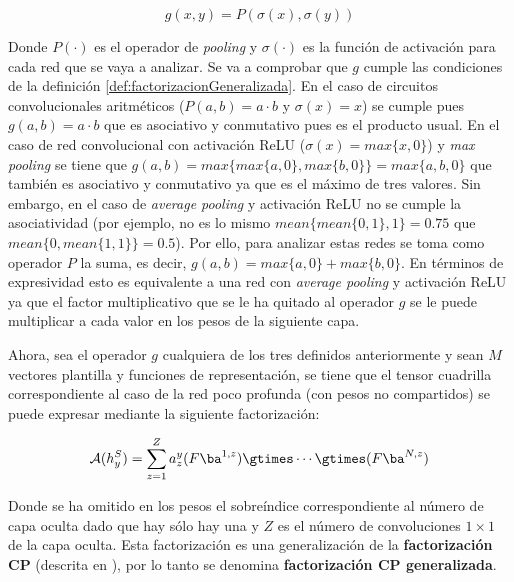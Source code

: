 \begin{equation}
	g(x,y)=P(\sigma(x),\sigma(y))
\end{equation}

Donde $P(\cdot)$ es el operador de \textit{pooling} y $\sigma(\cdot)$ es la función de activación para cada red que se vaya a analizar. Se va a comprobar que $g$ cumple las condiciones de la definición \ref{def:factorizacionGeneralizada}. En el caso de circuitos convolucionales aritméticos ($P(a,b)=a\cdot b$ y $\sigma(x)=x$) se cumple pues $g(a,b)=a\cdot b$ que es asociativo y conmutativo pues es el producto usual. En el caso de red convolucional con activación ReLU ($\sigma(x) = max\{x,0\}$) y \textit{max pooling} se tiene que $g(a,b)=max\{max\{a,0\},max\{b,0\}\}=max\{a,b,0\}$ que también es asociativo y conmutativo ya que es el máximo de tres valores. Sin embargo, en el caso de \textit{average pooling} y activación ReLU no se cumple la asociatividad (por ejemplo, no es lo mismo $mean\{mean\{0,1\},1\} = 0.75$ que $mean\{0,mean\{1,1\}\} = 0.5$). Por ello, para analizar estas redes se toma como operador $P$ la suma, es decir, $g(a,b) = max\{a,0\} + max\{b,0\}$. En términos de expresividad esto es equivalente a una red con \textit{average pooling} y activación ReLU ya que el factor multiplicativo que se le ha quitado al operador $g$ se le puede multiplicar a cada valor en los pesos de la siguiente capa.

Ahora, sea el operador $g$ cualquiera de los tres definidos anteriormente y sean $M$ vectores plantilla y funciones de representación, se tiene que el tensor cuadrilla correspondiente al caso de la red poco profunda (con pesos no compartidos) se puede expresar mediante la siguiente factorización:

\begin{equation} \label{fac:tenshal}
\mathcal{A}(h_y^S)=\sum_{z=1}^{Z}a^y_z(F\ba^{1,z})\gtimes\cdots \gtimes(F\ba^{N,z})
\end{equation}

Donde se ha omitido en los pesos el sobreíndice correspondiente al número de capa oculta dado que hay sólo hay una y $Z$ es el número de convoluciones $1\times 1$ de la capa oculta. Esta factorización es una generalización de la \textbf{factorización CP} (descrita en \cite{doi:10.1137/07070111X}), por lo tanto se denomina \textbf{factorización CP generalizada}.

